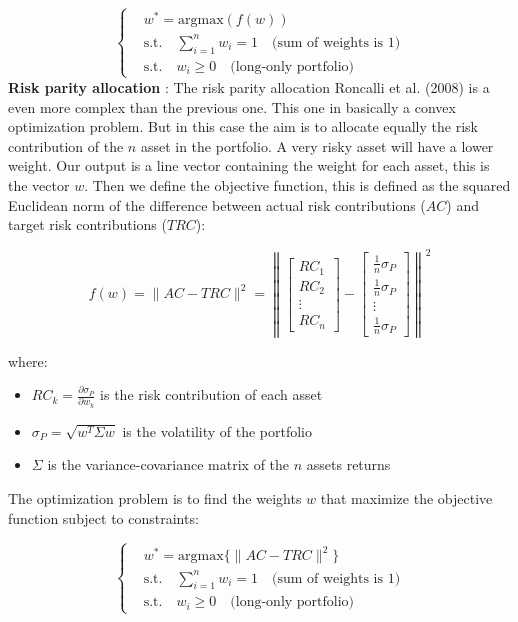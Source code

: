 \documentclass{article}
\begin{document}
\[
	\begin{cases}
		\textbf{} & w^*=\text{argmax}(f(w))                                                    \\
		\text{}   & \text{s.t.} \quad\sum_{i=1}^{n} w_i = 1 \quad \text{(sum of weights is 1)} \\
		\text{}   & \text{s.t.} \quad w_i \geq 0 \quad \text{(long-only portfolio)}
	\end{cases}
\]
\newline
\textbf{Risk parity allocation} : The risk parity allocation Roncalli et al. (2008)\cite{Maillard2008} is a even more complex than the previous one. This one in basically a convex optimization problem. But in this case the aim is to allocate equally the risk contribution of the $n$ asset in the portfolio. A very risky asset will have a lower weight. Our output is a line vector containing the weight for each asset, this is the vector $w$. Then we define the objective function, this is defined as the squared Euclidean norm of the difference between actual risk contributions (\(AC\)) and target risk contributions (\(TRC\)):

$$f(w) = \lVert AC - TRC \rVert^2=\left\lVert \begin{bmatrix} RC_1 \\ RC_2 \\ \vdots \\ RC_n \end{bmatrix} - \begin{bmatrix} \frac{1}{n} \sigma_P \\ \frac{1}{n} \sigma_P \\ \vdots \\ \frac{1}{n} \sigma_P \end{bmatrix} \right\rVert^2$$

where:
\begin{itemize}
	\item $RC_k = \frac{\partial \sigma_P}{\partial w_k}$ is the risk contribution of each asset
	\item $\sigma_P=\sqrt{w^T \Sigma w}$ is the volatility of the portfolio
	\item $\Sigma$ is the variance-covariance matrix of the $n$ assets returns
\end{itemize}

The optimization problem is to find the weights $w$ that maximize the objective function subject to constraints:

\[
	\begin{cases}
		\text{} & w^*=\text{argmax}\{\lVert AC - TRC \rVert^2\}                              \\
		\text{} & \text{s.t.}\quad \sum_{i=1}^{n} w_i = 1 \quad \text{(sum of weights is 1)} \\
		\text{} & \text{s.t.}\quad w_i \geq 0 \quad \text{(long-only portfolio)}
	\end{cases}
\]
\end{document}
